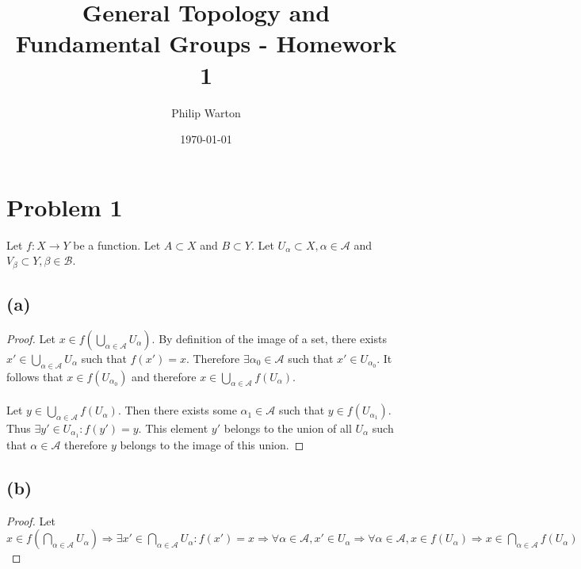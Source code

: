 \documentclass{article}
\theoremstyle{definition}
\begin{document}
\title{General Topology and Fundamental Groups - Homework 1}
\author{Philip Warton}
\date{\today}
\maketitle
\section*{Problem 1}
    Let $f: X \rightarrow Y$ be a function. Let $A \subset X$ and $B \subset Y$.
    Let $U_\alpha \subset X, \alpha \in \mathcal{A}$ and $V_\beta \subset Y, \beta \in \mathcal{B}$.
    \subsection*{(a)}
        \begin{proof}
            \fbox{$\subset$} Let $x \in f(\bigcup_{\alpha \in \mathcal{A}}U_\alpha)$.
            By definition of the image of a set, there exists $x' \in \bigcup_{\alpha \in \mathcal{A}}U_\alpha$ such that $f(x') = x$.
            Therefore $\exists \alpha_0 \in \mathcal{A}$ such that $x' \in U_{\alpha_0}$.
            It follows that $x \in f(U_{\alpha_0})$ and therefore $x \in \bigcup_{\alpha \in \mathcal{A}} f(U_\alpha)$. \\\\
            \fbox{$\supset$} Let $y \in \bigcup_{\alpha \in \mathcal{A}} f(U_\alpha)$.
            Then there exists some $\alpha_1 \in \mathcal{A}$ such that $y \in f(U_{\alpha_1})$.
            Thus $\exists y' \in U_{\alpha_1} : f(y') = y$.
            This element $y'$ belongs to the union of all $U_\alpha$ such that $\alpha \in \mathcal{A}$ therefore
            $y$ belongs to the image of this union.
        \end{proof}
    \subsection*{(b)}
        \begin{proof}
            Let $x \in f(\bigcap_{\alpha \in \mathcal{A}} U_\alpha) \Longrightarrow \exists x' \in \bigcap_{\alpha \in \mathcal{A}} U_\alpha :
            f(x') = x \Longrightarrow \forall \alpha \in \mathcal{A}, x' \in U_\alpha \Longrightarrow \forall \alpha \in \mathcal{A}, x \in 
            f(U_\alpha) \Longrightarrow x \in \bigcap_{\alpha \in \mathcal{A}} f(U_\alpha)$
        \end{proof}
\end{document}
